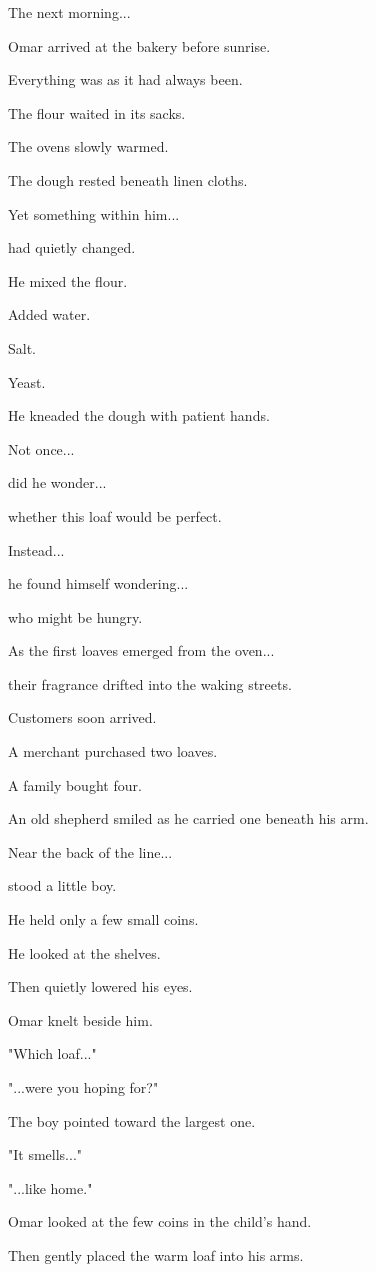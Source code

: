 \documentclass[12pt,openany]{book}
\begin{document}
The next morning...

Omar arrived at the bakery before sunrise.

Everything was as it had always been.

The flour waited in its sacks.

The ovens slowly warmed.

The dough rested beneath linen cloths.

Yet something within him...

had quietly changed.

He mixed the flour.

Added water.

Salt.

Yeast.

He kneaded the dough with patient hands.

Not once...

did he wonder...

whether this loaf would be perfect.

Instead...

he found himself wondering...

who might be hungry.

As the first loaves emerged from the oven...

their fragrance drifted into the waking streets.

Customers soon arrived.

A merchant purchased two loaves.

A family bought four.

An old shepherd smiled as he carried one beneath his arm.

Near the back of the line...

stood a little boy.

He held only a few small coins.

He looked at the shelves.

Then quietly lowered his eyes.

Omar knelt beside him.

"Which loaf..."

"...were you hoping for?"

The boy pointed toward the largest one.

"It smells..."

"...like home."

Omar looked at the few coins in the child's hand.

Then gently placed the warm loaf into his arms.
\end{document}
